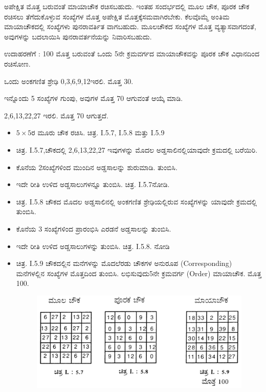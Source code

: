 ಅಪೇಕ್ಷಿತ ಮೊತ್ತ ಬರುವಂತೆ ಮಾಯಾಚೌಕ ರಚಿಸಬಹುದು. ಇಂತಹ ಸಂದರ್ಭದಲ್ಲಿ ಮೂಲ ಚೌಕ, ಪೂರಕ ಚೌಕ ರಚಿಸಲು ತೆಗೆದುಕೊಳ್ಳುವ ಸಂಖ್ಯೆಗಳ ಮೊತ್ತ ಅಪೇಕ್ಷಿತ ಮೊತ್ತಕ್ಕೆ\break ಸಮವಾಗಿರಬೇಕು. ಕೆಲವೊಮ್ಮೆ ಅಂತಿಮ ಮಾಯಾಚೌಕದಲ್ಲಿ ಸಂಖ್ಯೆಗಳು ಪುನರಾವರ್ತಿತ ವಾಗಬಹುದು. ಮೂಲಚೌಕದ ಸಂಖ್ಯೆಗಳ ಮೊತ್ತ ವ್ಯತ್ಯಾಸವಾಗದಂತೆ, ಅವುಗಳನ್ನು ಬದ\-ಲಾಯಿಸಿ ಪುನರಾವರ್ತನೆಯನ್ನು ನಿವಾರಿಸಬಹುದು.

ಉದಾಹರಣೆಗೆ : 100 ಮೊತ್ತ ಬರುವಂತೆ ಒಂದು 5ನೇ ಕ್ರಮವರ್ಗದ ಮಾಯಾಚೌಕ\-ವನ್ನು ಪೂರಕ ಚೌಕ ವಿಧಾನದಿಂದ ರಚಿಸೋಣ.

ಒಂದು ಅಂಕಗಣಿತ ಶ್ರೇಢಿ 0,3,6,9,12ಇರಲಿ. ಮೊತ್ತ 30.

ಇನ್ನೊಂದು 5 ಸಂಖ್ಯೆಗಳ ಗುಂಪು, ಅವುಗಳ ಮೊತ್ತ 70 ಆಗುವಂತೆ ಆಯ್ಕೆ ಮಾಡಿ.

2,6,13,22,27 ಇರಲಿ. ಮೊತ್ತ 70 ಆಗುತ್ತದೆ.

\begin{itemize}
	\item $5 \times 5$ರ ಮೂರು ಚೌಕ ರಚಿಸಿ. ಚಿತ್ರ. I.5.7, I.5.8 ಮತ್ತು I.5.9
	\item ಚಿತ್ರ. I.5.7,ಚೌಕದಲ್ಲಿ 2,6,13,22,27 ಇವುಗಳನ್ನು ಮೊದಲ ಅಡ್ಡಸಾಲಿನಲ್ಲಿ\break ಯಾವುದೇ ಕ್ರಮದಲ್ಲಿ ಬರೆಯಿರಿ.
	\item ಕೊನೆಯ 2ಸಂಖ್ಯೆಗಳಿಂದ ಮುಂದಿನ ಅಡ್ಡಸಾಲನ್ನು ಶುರುಮಾಡಿ. ತುಂಬಿಸಿ.
	\item ಇದೇ ರೀತಿ ಉಳಿದ ಅಡ್ಡಸಾಲುಗಳನ್ನೂ ತುಂಬಿಸಿ. ಚಿತ್ರ. I.5.7ನೋಡಿ.
	\item ಚಿತ್ರ. I.5.8 ಚೌಕದ ಮೊದಲ ಅಡ್ಡಸಾಲಿನಲ್ಲಿ ಅಂಕಗಣಿತ ಶ್ರೇಢಿಯಲ್ಲಿರುವ ಸಂಖ್ಯೆಗಳನ್ನು ಯಾವುದೇ ಕ್ರಮದಲ್ಲಿ ತುಂಬಿಸಿ.
	\item ಕೊನೆಯ 3 ಸಂಖ್ಯೆಗಳಿಂದ ಪ್ರಾರಂಭಿಸಿ ಎರಡನೆ ಅಡ್ಡಸಾಲನ್ನು ತುಂಬಿಸಿ.
	\item ಇದೇ ರೀತಿ ಉಳಿದ ಅಡ್ಡಸಾಲುಗಳನ್ನು ತುಂಬಿಸಿ. ಚಿತ್ರ. I.5.8. ನೋಡಿ
\newpage
	\item ಚಿತ್ರ. I.5.9 ಚೌಕದಲ್ಲಿನ ಮನೆಗಳನ್ನು ಮೊದಲೆರಡು ಚೌಕಗಳ ಅನುರೂಪ (Corresponding) ಮನೆಗಳಲ್ಲಿನ ಸಂಖ್ಯೆಗಳ ಮೊತ್ತದಿಂದ ತುಂಬಿಸಿ. ಲಭಿಸುವುದು\break 5ನೇ ಕ್ರಮವರ್ಗ (Order) ಮಾಯಾಚೌಕ. ಮೊತ್ತ 100.

	\begin{figure}[h]
	\includegraphics{src/figures/chap3/fig3.13.jpg}
	\end{figure}
\end{itemize}

